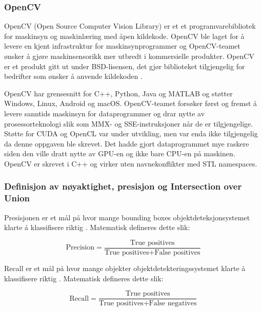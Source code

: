 \subsubsection{OpenCV}

OpenCV (Open Source Computer Vision Library) er et et programvarebibliotek for maskinsyn og maskinlæring med åpen kildekode. OpenCV ble laget for å levere en kjent infrastruktur for maskinsynprogrammer og OpenCV-teamet ønsker å gjøre maskinsensorikk mer utbredt i kommersielle produkter. OpenCV er et produkt gitt ut under BSD-lisensen, det gjør biblioteket tilgjengelig for bedrifter som ønsker å anvende kildekoden \cite{OpenCV Team 2020}.

OpenCV har grensesnitt for C++, Python, Java og MATLAB og støtter Windows, Linux, Android og macOS. OpenCV-teamet forsøker først og fremst å levere sanntids maskinsyn for dataprogrammer og drar nytte av prosessorteknologi slik som MMX- og SSE-instruksjoner når de er tilgjengelige. Støtte for CUDA og OpenCL var under utvikling, men var enda ikke tilgjengelig da denne oppgaven ble skrevet. Det hadde gjort dataprogrammet mye raskere siden den ville dratt nytte av GPU-en og ikke bare CPU-en på maskinen. OpenCV er skrevet i C++ og virker uten navnekonflikter med STL namespaces. \cite{OpenCV Team 2020}

\subsubsection{Definisjon av nøyaktighet, presisjon og Intersection over Union}

Presisjonen er et mål på hvor mange bounding boxes objektdeteksjonsystemet klarte å klassifisere riktig \cite{Siddiqui m.fl. 207 s. 383}. Matematisk defineres dette slik:

\begin{equation}
\text{Precision} = \frac{\text{True positives}}{\text{True positives} + \text{False positives}}
\end{equation}


Recall er et mål på hvor mange objekter objektdetekteringssystemet klarte å klassifisere riktig \cite{Siddiqui m.fl. 207 s. 383}. Matematisk defineres dette slik:

\begin{equation}
\text{Recall} = \frac{\text{True positives}}{\text{True positives} + \text{False negatives}}
\end{equation}

